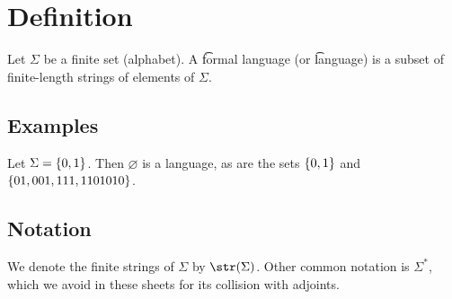 
\section*{Definition}

Let $\Sigma $ be a finite set (alphabet).
A \t{formal language} (or \t{language}) is a subset of finite-length strings of elements of $\Sigma $.

\subsection*{Examples}

Let $\Sigma  = \{0,1\}$.
Then $\varnothing$ is a language, as are the sets $\{0, 1\}$ and $\{01, 001, 111, 1101010\}$.

\subsection*{Notation}

We denote the finite strings of $\Sigma $ by $\str(\Sigma )$.
Other common notation is $\Sigma ^*$, which we avoid in these sheets for its collision with adjoints.

\blankpage